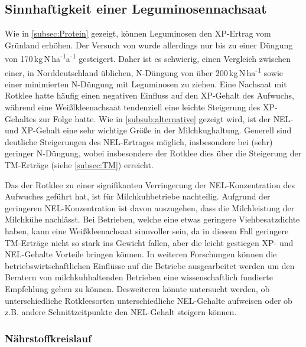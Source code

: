 \subsection{Sinnhaftigkeit einer Leguminosennachsaat}
\label{sub:leguminosen}
Wie in \cref{subsec:Protein} gezeigt, können Leguminosen den \ac{XP}-Ertrag vom Grünland erhöhen.
Der Versuch von \textcite{weggler2050leguminosen} wurde allerdings nur bis zu einer Düngung von 170\,kg\,N\,ha\textsuperscript{-1}a\textsuperscript{-1} gesteigert.
Daher ist es schwierig, einen Vergleich zwischen einer, in Norddeutschland üblichen, N-Düngung von über 200\,kg\,N\,ha\textsuperscript{-1} sowie einer minimierten N-Düngung mit Leguminosen zu ziehen.
Eine Nachsaat mit Rotklee hatte häufig einen negativen Einfluss auf den \ac{XP}-Gehalt des Aufwuchs, während eine Weißlkleenachsaat tendenziell eine leichte Steigerung des \ac{XP}-Gehaltes zur Folge hatte.
Wie in \cref{subsub:alternative} gezeigt wird, ist der \ac{NEL}- und \ac{XP}-Gehalt eine sehr wichtige Größe in der Milchkughaltung. 
Generell sind deutliche Steigerungen des \ac{NEL}-Ertrages möglich, insbesondere bei (sehr) geringer N-Düngung, wobei insbesondere der Rotklee dies über die Steigerung der \ac{TM}-Erträge (siehe \cref{subsec:TM}) erreicht.

Das der Rotklee zu einer signifikanten Verringerung der \ac{NEL}-Konzentration des Aufwuches geführt hat, ist für Milchkuhbetriebe nachteilig.
Aufgrund der geringeren \ac{NEL}-Konzentration ist davon auszugehen, dass die Milchleistung der Milchkühe nachlässt.
Bei Betrieben, welche eine etwas geringere Viehbesatzdichte haben, kann eine Weißkleenachsaat sinnvoller sein, da in diesem Fall geringere \ac{TM}-Erträge nicht so stark ins Gewicht fallen, aber die leicht gestiegen \ac{XP}- und \ac{NEL}-Gehalte Vorteile bringen können.
In weiteren Forschungen können die betriebswirtschaftlichen Einflüsse auf die Betriebe ausgearbeitet werden um den Beratern von milchkuhhaltenden Betrieben eine wissenschaftlich fundierte Empfehlung geben zu können.
Desweiteren könnte untersucht werden, ob unterschiedliche Rotkleesorten unterschiedliche \ac{NEL}-Gehalte aufweisen oder ob z.B. andere Schnittzeitpunkte den \ac{NEL}-Gehalt steigern können.

\subsubsection{Nährstoffkreislauf}
\label{subsub:nährstoffkreislauf}

